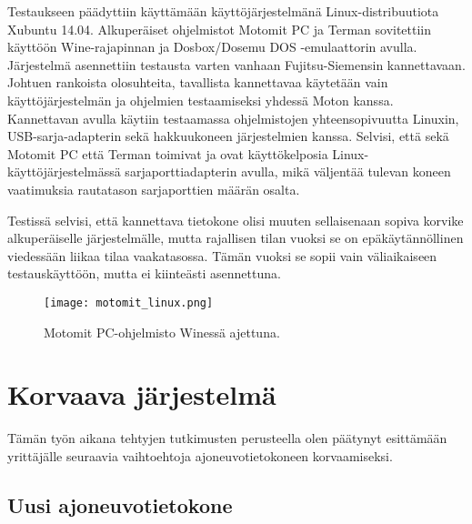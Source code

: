 Testaukseen päädyttiin käyttämään käyttöjärjestelmänä Linux-distribuutiota Xubuntu 14.04. Alkuperäiset ohjelmistot Motomit PC ja Terman sovitettiin käyttöön Wine-rajapinnan ja Dosbox/Dosemu DOS -emulaattorin avulla. Järjestelmä asennettiin testausta varten vanhaan Fujitsu-Siemensin kannettavaan. Johtuen rankoista olosuhteita, tavallista kannettavaa käytetään vain käyttöjärjestelmän ja ohjelmien testaamiseksi yhdessä Moton kanssa. Kannettavan avulla käytiin testaamassa ohjelmistojen yhteensopivuutta Linuxin, USB-sarja-adapterin sekä hakkuukoneen järjestelmien kanssa. Selvisi, että sekä Motomit PC että Terman toimivat ja ovat käyttökelposia Linux-käyttöjärjestelmässä sarjaporttiadapterin avulla, mikä väljentää tulevan koneen vaatimuksia rautatason sarjaporttien määrän osalta.

Testissä selvisi, että kannettava tietokone olisi muuten sellaisenaan sopiva korvike alkuperäiselle järjestelmälle, mutta rajallisen tilan vuoksi se on epäkäytännöllinen viedessään liikaa tilaa vaakatasossa. Tämän vuoksi se sopii vain väliaikaiseen testauskäyttöön, mutta ei kiinteästi asennettuna.


\begin{figure}[H]
\centering
\texttt{[image: motomit\_linux.png]}
\caption{Motomit PC-ohjelmisto Winessä ajettuna.}
\end{figure}


\newpage

\chapter{Korvaava järjestelmä}
\label{ch:korvaava_jarjestelma}

Tämän työn aikana tehtyjen tutkimusten perusteella olen päätynyt esittämään yrittäjälle seuraavia vaihtoehtoja ajoneuvotietokoneen korvaamiseksi.

\section{Uusi ajoneuvotietokone}

